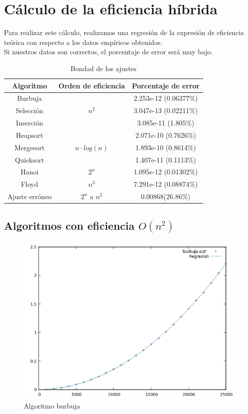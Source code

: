 \documentclass[12pt,spanish]{article}
\begin{document}
\section{Cálculo de la eficiencia híbrida}
Para realizar este cálculo, realizamos una regresión de la expresión de eficiencia teórica con respecto a los datos empíricos obtenidos.\\
Si nuestros datos son correctos, el porcentaje de error será muy bajo.
\begin{table}[H]
\centering
\begin{tabular}{|c|c|c|}
\hline
\textbf{Algoritmo} & \textbf{Orden de eficiencia} & \textbf{Porcentaje de error} \\
\hline
Burbuja &  & 2.253e-12 (0.06377\%)\\
Selección & $n^2$ & 3.047e-13 (0.02211\%)\\
Inserción & & 3.085e-11 (1.805\%) \\
\hline
Heapsort &  & 2.071e-10 (0.7626\%) \\
Mergesort & $n \cdot log(n)$ & 1.893e-10 (0.8614\%) \\
Quicksort & & 1.407e-11 (0.1113\%) \\
\hline
Hanoi & $2^n$ & 1.095e-12 (0.01302\%) \\
\hline
Floyd & $n^3$ & 7.291e-12 (0.08874\%) \\
\hline
{\color{red}Ajuste erróneo} & {\color{red}$2^n$ a $n^2$} & {\color{red}0.00868(26.86\%)}\\
\hline
\end{tabular}
\caption{Bondad de los ajustes}
\end{table}

\subsection{Algoritmos con eficiencia $O(n^2)$}

\begin{figure}[H]
\centering
\includegraphics[scale=0.75]{hibrida_burbuja.png}
\caption{Algoritmo burbuja}
\end{figure}
\end{document}
